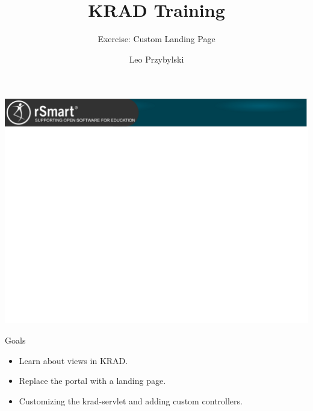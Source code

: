 \documentclass[xcolor=dvipsnames,14pt,professionalfonts]{beamer}
\begin{document}
\title{KRAD Training}
\subtitle{Exercise: Custom Landing Page}
\author[Leo]{Leo Przybylski}

\usebackgroundtemplate%
{%
    \includegraphics[width=\paperwidth,height=\paperheight]{../img/header.png}%
}

{
%
\begin{frame}[plain]
  \titlepage
\end{frame}
}

\begin{frame}{Goals}
  \begin{itemize}
  \item Learn about views in KRAD.
  \item Replace the portal with a landing page.
  \item Customizing the krad-servlet and adding custom controllers.
  \end{itemize}
\end{frame}
\end{document}
